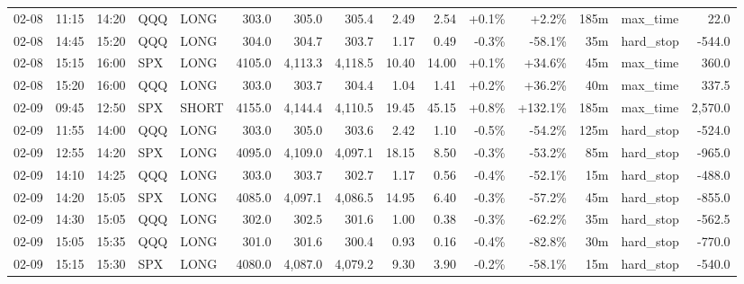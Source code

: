 \documentclass[11pt,a4paper,twoside]{article}
\begin{document}
\begin{landscape}
\begin{center}
\begin{longtable}{>{\color{txtmain}}l l l l l r r r r r r r r >{\color{txtmain}}l r}
02-08 & 11:15 & 14:20 & QQQ & LONG & 303.0 & 305.0 & 305.4 & 2.49 & 2.54 & \textcolor{wingreen}{+0.1\%} & \textcolor{wingreen}{+2.2\%} & 185m & max\_time & \textcolor{wingreen}{22.0} \\
02-08 & 14:45 & 15:20 & QQQ & LONG & 304.0 & 304.7 & 303.7 & 1.17 & 0.49 & \textcolor{lossred}{-0.3\%} & \textcolor{lossred}{-58.1\%} & 35m & hard\_stop & \textcolor{lossred}{-544.0} \\
02-08 & 15:15 & 16:00 & SPX & LONG & 4105.0 & 4,113.3 & 4,118.5 & 10.40 & 14.00 & \textcolor{wingreen}{+0.1\%} & \textcolor{wingreen}{+34.6\%} & 45m & max\_time & \textcolor{wingreen}{360.0} \\
02-08 & 15:20 & 16:00 & QQQ & LONG & 303.0 & 303.7 & 304.4 & 1.04 & 1.41 & \textcolor{wingreen}{+0.2\%} & \textcolor{wingreen}{+36.2\%} & 40m & max\_time & \textcolor{wingreen}{337.5} \\
02-09 & 09:45 & 12:50 & SPX & SHORT & 4155.0 & 4,144.4 & 4,110.5 & 19.45 & 45.15 & \textcolor{wingreen}{+0.8\%} & \textcolor{wingreen}{+132.1\%} & 185m & max\_time & \textcolor{wingreen}{2,570.0} \\
02-09 & 11:55 & 14:00 & QQQ & LONG & 303.0 & 305.0 & 303.6 & 2.42 & 1.10 & \textcolor{lossred}{-0.5\%} & \textcolor{lossred}{-54.2\%} & 125m & hard\_stop & \textcolor{lossred}{-524.0} \\
02-09 & 12:55 & 14:20 & SPX & LONG & 4095.0 & 4,109.0 & 4,097.1 & 18.15 & 8.50 & \textcolor{lossred}{-0.3\%} & \textcolor{lossred}{-53.2\%} & 85m & hard\_stop & \textcolor{lossred}{-965.0} \\
02-09 & 14:10 & 14:25 & QQQ & LONG & 303.0 & 303.7 & 302.7 & 1.17 & 0.56 & \textcolor{lossred}{-0.4\%} & \textcolor{lossred}{-52.1\%} & 15m & hard\_stop & \textcolor{lossred}{-488.0} \\
02-09 & 14:20 & 15:05 & SPX & LONG & 4085.0 & 4,097.1 & 4,086.5 & 14.95 & 6.40 & \textcolor{lossred}{-0.3\%} & \textcolor{lossred}{-57.2\%} & 45m & hard\_stop & \textcolor{lossred}{-855.0} \\
02-09 & 14:30 & 15:05 & QQQ & LONG & 302.0 & 302.5 & 301.6 & 1.00 & 0.38 & \textcolor{lossred}{-0.3\%} & \textcolor{lossred}{-62.2\%} & 35m & hard\_stop & \textcolor{lossred}{-562.5} \\
02-09 & 15:05 & 15:35 & QQQ & LONG & 301.0 & 301.6 & 300.4 & 0.93 & 0.16 & \textcolor{lossred}{-0.4\%} & \textcolor{lossred}{-82.8\%} & 30m & hard\_stop & \textcolor{lossred}{-770.0} \\
02-09 & 15:15 & 15:30 & SPX & LONG & 4080.0 & 4,087.0 & 4,079.2 & 9.30 & 3.90 & \textcolor{lossred}{-0.2\%} & \textcolor{lossred}{-58.1\%} & 15m & hard\_stop & \textcolor{lossred}{-540.0} \\

\end{longtable}
\end{center}
\end{landscape}
\end{document}
